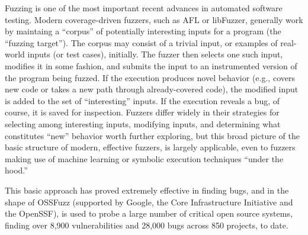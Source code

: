 \documentclass[numbers]{proposalnsf}
\begin{document}
Fuzzing \cite{fuzzoverview} is one of the most important recent advances in automated software testing.  Modern coverage-driven fuzzers, such as AFL or libFuzzer, generally work by maintaing a ``corpus'' of potentially interesting inputs for a program (the ``fuzzing target'').  The corpus may consist of a trivial input, or examples of real-world inputs (or test cases), initially.  The fuzzer then selects one such input, modifies it in some fashion, and submits the input to an instrumented version of the program being fuzzed.  If the execution produces novel behavior (e.g., covers new code or takes a new path through already-covered code), the modified input is added to the set of ``interesting'' inputs.   If the execution reveals a bug, of course, it is saved for inspection.   Fuzzers differ widely in their strategies for selecting among interesting inputs, modifying inputs, and determining what constitutes ``new'' behavior worth further exploring, but this broad picture of the basic structure of modern, effective fuzzers, is largely applicable, even to fuzzers making use of machine learning or symbolic execution techniques ``under the hood.''

This basic approach has proved extremely effective in finding bugs, and in the shape of OSSFuzz (supported by Google, the Core Infrastructure Initiative and the OpenSSF), is used to probe a large number of critical open source systems, finding over 8,900 vulnerabilities and 28,000 bugs across 850 projects, to date.
\end{document}
